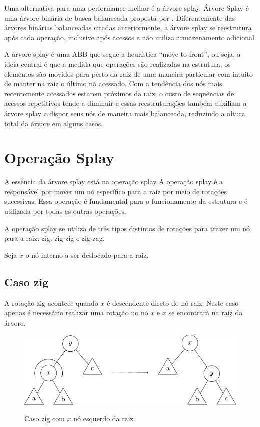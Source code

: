 Uma alternativa para uma performance melhor é a árvore splay. Árvore Splay é uma árvore binária de busca balanceada proposta por \cite{selfadjustingbst}. Diferentemente das árvores binárias balanceadas citadas anteriormente, a árvore splay se reestrutura após cada operação, inclusive após acessos e não utiliza armazenamento adicional.

A árvore splay é uma ABB que segue a heurística “move to front”, ou seja, a ideia central é que a medida que operações são realizadas na estrutura, os elementos são movidos para perto da raiz de uma maneira particular com intuito de manter na raiz o último nó acessado.
Com a tendência dos nós mais recentemente acessados estarem próximos da raiz, o custo de sequências de acessos repetitivos tende a diminuir e essas reestruturações também auxiliam a árvore splay a dispor seus nós de maneira mais balanceada, reduzindo a altura total da árvore em alguns casos.

\section{Operação Splay}

A essência da árvore splay está na operação splay A operação splay é a responsável por mover um nó específico para a raiz por meio de rotações sucessivas. Essa operação é fundamental para o funcionamento da estrutura e é utilizada por todas as outras operações.

A operação splay se utiliza de três tipos distintos de rotações para trazer um nó para a raiz: zig, zig-zig e zig-zag.

Seja $x$ o nó interno a ser deslocado para a raiz. 

\subsection{Caso zig}

A rotação zig acontece quando $x$ é descendente direto do nó raiz. Neste caso apenas é necessário realizar uma rotação no nó $x$ e $x$ se encontrará na raiz da árvore.

\begin{figure}[h]
    \centering
    \includegraphics{images/zig.pdf}
    \label{fig:zig}

\caption{Caso zig com $x$ nó esquerdo da raiz.}
\end{figure}


